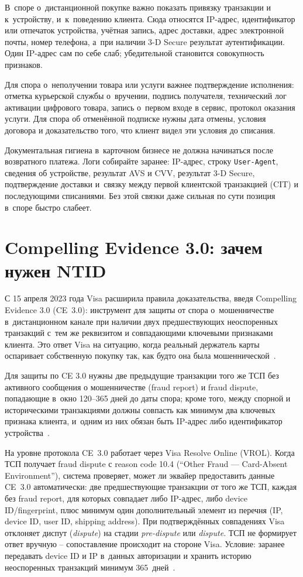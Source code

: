 В~споре о~дистанционной покупке важно показать привязку транзакции
и к~устройству, и~к~поведению клиента. Сюда относятся IP-адрес,
идентификатор или отпечаток устройства,
учётная запись, адрес доставки, адрес электронной почты, номер телефона,
а~при наличии 3-D Secure результат аутентификации. Один IP-адрес
сам по себе слаб; убедительной становится совокупность признаков.

Для спора о~неполучении товара или услуги важнее подтверждение
исполнения: отметка курьерской службы о~вручении, подпись получателя,
технический лог активации цифрового товара, запись о~первом входе в
сервис, протокол оказания услуги. Для спора об отменённой подписке
нужны дата отмены, условия договора и доказательство того, что клиент
видел эти условия до списания.

Документальная гигиена в~карточном бизнесе не должна начинаться
после возвратного платежа. Логи собирайте заранее: IP-адрес, строку
\texttt{User-Agent}, сведения об устройстве, результат AVS и CVV,
результат 3-D Secure, подтверждение доставки и~связку между первой
клиентской транзакцией (CIT) и последующими списаниями. Без этой
связки даже сильная по сути позиция в~споре быстро слабеет.

\section{Compelling Evidence 3.0: зачем нужен NTID}\label{sec:disputes-ce30}

С 15 апреля 2023 года Visa расширила правила доказательства, введя
Compelling Evidence 3.0 (CE~3.0): инструмент для защиты от
спора о~мошенничестве в~дистанционном канале при наличии двух
предшествующих неоспоренных транзакций с~тем же реквизитом и
совпадающими ключевыми признаками клиента. Это ответ Visa на
ситуацию, когда реальный держатель карты оспаривает
собственную покупку так, как будто она была мошеннической~\cite{visa-ce30-merchant-readiness,visa-core-rules}.

Для защиты по CE 3.0 нужны две
предыдущие транзакции того же ТСП без активного сообщения о
мошенничестве (fraud report) и fraud dispute, попадающие в~окно
120--365 дней до даты спора; кроме
того, между спорной и историческими транзакциями должны совпасть как
минимум два ключевых признака клиента, и~одним из них обязан быть
IP-адрес либо идентификатор устройства~\cite{visa-ce30-merchant-readiness}.

На уровне протокола CE~3.0 работает через Visa Resolve Online
(VROL). Когда ТСП получает fraud dispute с reason code 10.4
(\enquote{Other Fraud --- Card-Absent Environment}), система
проверяет, может ли эквайер предоставить данные CE~3.0
автоматически: две предшествующие транзакции от того же ТСП,
каждая без fraud report, для которых совпадает либо IP-адрес,
либо device ID/fingerprint, плюс минимум один дополнительный
элемент из перечня (IP, device ID, user ID, shipping address).
При подтверждённых совпадениях Visa отклоняет диспут (\textit{dispute})
на стадии \textit{pre-dispute} или \textit{dispute}. ТСП не формирует ответ вручную --
сопоставление происходит на стороне Visa. Условие: заранее передавать
device ID и IP в~данных авторизации и хранить историю
неоспоренных транзакций минимум 365~дней~\cite{visa-ce30-merchant-readiness}.

